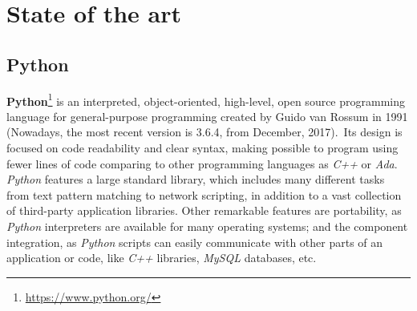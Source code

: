 \documentclass[a4paper, 12pt]{book}
\begin{document}
\chapter{State of the art}
\section{Python}
\label{sec:python}
\textbf{Python}\footnote{\url{https://www.python.org/}} is an interpreted, object-oriented, high-level, open source
programming language for general-purpose programming created by Guido van Rossum in 1991 (Nowadays, the most
recent version is 3.6.4, from December, 2017).\ Its design is focused on code readability and clear syntax, making
possible to program using fewer lines of code comparing to other programming languages as \emph{C++} or \emph{Ada}.\\
\emph{Python} features a large standard library, which includes many different tasks from text pattern matching to network
scripting, in addition to a vast collection of third-party application libraries.
Other remarkable features are portability, as \emph{Python} interpreters are available for many operating systems;
and the component integration, as \emph{Python} scripts can easily communicate with other parts of an application or code,
like \emph{C++} libraries, \emph{MySQL} databases, etc.\\
\end{document}
